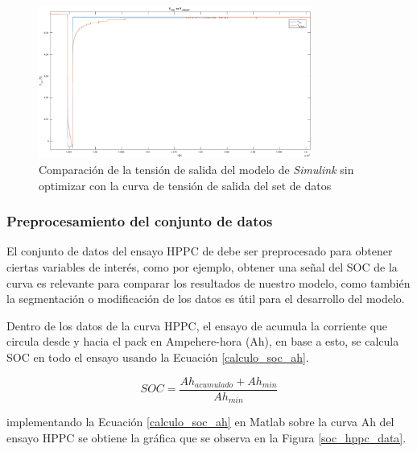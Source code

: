 \documentclass[10pt,a4paper]{article}
\newcounter{subsubsubsection}[subsubsection]
\begin{document}
\begin{figure}[h!]
    \begin{center}
        \includegraphics[width=0.8\textwidth]{v_sim_v_dataset_no_opt.eps}
        \caption{Comparaci\'on de la tensi\'on de salida del modelo de
                 \emph{Simulink} sin optimizar con la curva de tensi\'on de 
                 salida del set de datos}
         \label{comp_simulink_no_opt}
    \end{center}
\end{figure}

\newpage

\subsubsection{Preprocesamiento del conjunto de datos}\label{data_preprocessing}

El conjunto de datos del ensayo \acrshort{HPPC} de \cite{Kollmeyer2018} 
debe ser preprocesado para obtener ciertas variables de inter\'es, como por
ejemplo, obtener una señal del \acrshort{SOC} de la curva es relevante para
comparar los resultados de nuestro modelo, como tambi\'en la segmentaci\'on o
modificaci\'on de los datos es \'util para el desarrollo del modelo.


Dentro de los datos de la curva \acrshort{HPPC}, el ensayo de
\cite{Kollmeyer2018} acumula la corriente que circula desde y hacia el pack en
Ampehere-hora (Ah), en base a esto, se calcula \acrshort{SOC} en todo el ensayo
usando la Ecuaci\'on \ref{calculo_soc_ah}.

\begin{equation}
    SOC = \frac{Ah_{acumulado} + Ah_{min}}{Ah_{min}} \label{calculo_soc_ah}
\end{equation}

implementando la Ecuaci\'on \ref{calculo_soc_ah} en Matlab sobre la curva Ah del
ensayo \acrshort{HPPC} se obtiene la gr\'afica que se observa en la Figura
\ref{soc_hppc_data}.
\end{document}
